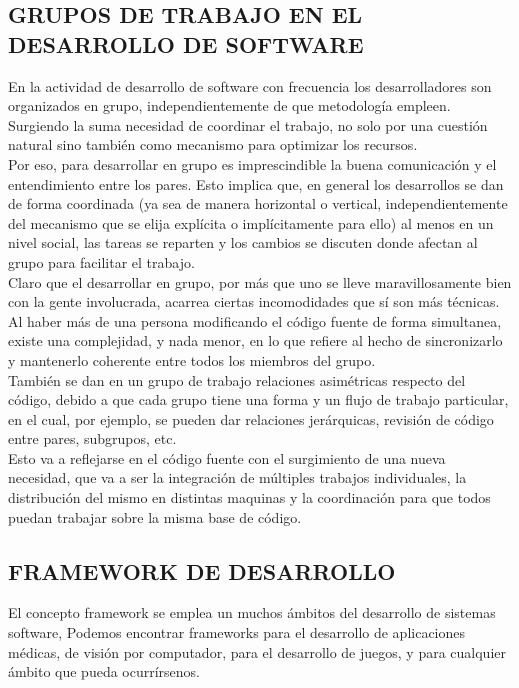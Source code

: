 \subsection{GRUPOS DE TRABAJO EN EL DESARROLLO DE SOFTWARE}

En la actividad de desarrollo de software con frecuencia los desarrolladores son organizados en grupo, independientemente de que metodología empleen. Surgiendo la suma necesidad de coordinar el trabajo, no solo por una cuestión natural sino también como mecanismo para optimizar los recursos.\\
Por eso, para desarrollar en grupo es imprescindible la buena comunicación y el entendimiento entre los pares. Esto implica que, en general los desarrollos se dan de forma coordinada (ya sea de manera horizontal o vertical, independientemente del mecanismo que se elija explícita o implícitamente para ello) al menos en un nivel social, las tareas se reparten y los cambios se discuten donde afectan al grupo para facilitar el trabajo.\\

Claro que el desarrollar en grupo, por más que uno se lleve maravillosamente bien con la gente involucrada, acarrea ciertas incomodidades que sí son más técnicas. Al haber más de una persona modificando el código fuente de forma simultanea, existe una complejidad, y nada menor, en lo que refiere al hecho de sincronizarlo y mantenerlo coherente entre todos los miembros del grupo.\\

También se dan en un grupo de trabajo relaciones asimétricas respecto del código, debido a que cada grupo tiene una forma y un flujo de trabajo particular, en el cual, por ejemplo, se pueden dar relaciones jerárquicas, revisión de código entre pares, subgrupos, etc.\\

Esto va a reflejarse en el código fuente con el surgimiento de una nueva necesidad, que va a ser la integración de múltiples trabajos individuales, la distribución del mismo en distintas maquinas y la coordinación para que todos puedan trabajar sobre la misma base de código.

\subsection{FRAMEWORK DE DESARROLLO}

El concepto framework se emplea un muchos ámbitos del desarrollo de sistemas
software, Podemos encontrar frameworks para el desarrollo de aplicaciones médicas, 
de visión por computador, para el desarrollo de juegos, y para cualquier ámbito que pueda ocurrírsenos.\\


